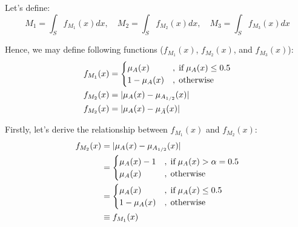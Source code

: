 \documentclass{tron}
\begin{document}
Let's define:
\begin{equation}
	 M_1 = \int_S f_{M_1}(x) dx, \quad M_2 = \int_S f_{M_2}(x) dx, \quad M_3 = \int_S f_{M_3}(x) dx \label{eqn:p1:Mi}
\end{equation}

Hence, we may define following functions ($f_{M_1}(x)$, $f_{M_2}(x)$, and $f_{M_3}(x)$):
\begin{align}
	f_{M_1}(x) & = \begin{cases}
		\mu_A(x) & ,\;\text{if}\; \mu_A(x) \leq 0.5 \\
		1-\mu_A(x) & ,\;\text{otherwise}
	\end{cases}\\
	f_{M_2}(x) & = |\mu_A(x) - \mu_{A_{1/2}}(x)| \\
	f_{M_2}(x) & = |\mu_A(x) - \mu_{\bar A}(x)| \\
\end{align}

Firstly, let's derive the relationship between $f_{M_1}(x)$ and $f_{M_2}(x)$:
\begin{align}
	f_{M_2}(x) 	& = |\mu_A(x) - \mu_{A_{1/2}}(x)| \\
				& = \begin{cases}
					\mu_A(x) - 1 &,\;\text{if}\; \mu_A(x) > \alpha = 0.5 \\
					\mu_A(x) &,\;\text{otherwise}
				\end{cases} \\
				& = \begin{cases}
					\mu_A(x) & ,\;\text{if}\; \mu_A(x) \leq 0.5 \\
					1-\mu_A(x) & ,\;\text{otherwise}
				\end{cases} \\
				& \equiv f_{M_1}(x) \label{eqn:p1:m2=m1}
\end{align}
\end{document}
